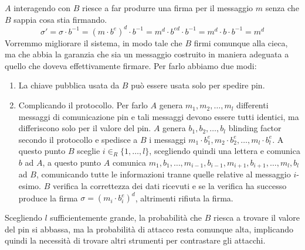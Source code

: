 $A$ interagendo con $B$ riesce a far produrre una firma per il messaggio $m$ senza che $B$ sappia
cosa stia firmando.
\[
  \sigma' = \sigma \cdot b^{-1} = (m \cdot  b^e)^d \cdot b^{-1} = m^d \cdot b^{ed} \cdot b^{-1} = 
  m^d \cdot b \cdot b^{-1} = m^d
\]
Vorremmo migliorare il sistema, in modo tale che $B$ firmi comunque alla cieca, ma che abbia la garanzia 
che sia un messaggio costruito in maniera adeguata a quello che doveva effettivamente firmare. Per farlo 
abbiamo due modi:
\begin{enumerate}
  \item La chiave pubblica usata da $B$ può essere usata solo per spedire pin.
  \item Complicando il protocollo. Per farlo $A$ genera $m_1, m_2, \dots, m_l$
  differenti messaggi di comunicazione pin e tali messaggi devono essere tutti 
  identici, ma differiscono solo per il valore del pin. $A$ genera $b_1, b_2, \dots, b_l$
  blinding factor secondo il protocollo e spedisce a $B$ i messaggi $m_1 \cdot b_1^e,
  m_2 \cdot b_2^e, \dots, m_l \cdot b_l^e$. A questo punto $B$ sceglie $i \in_R \{1, \dots, l\}$,
  scegliendo quindi una lettera e comunica $b$ ad $A$, a questo punto $A$ comunica 
  $m_1, b_1, \dots, m_{i-1},b_{i-1},m_{i+1},b_{i+1}, \dots, m_l, b_l$ ad $B$,
  comunicando tutte le informazioni tranne quelle relative al messaggio $i$-esimo.
  $B$ verifica la correttezza dei dati ricevuti e se la verifica ha successo produce 
  la firma $\sigma = (m_i \cdot b_i^e)^d$, altrimenti rifiuta la firma.
\end{enumerate}
Scegliendo $l$ sufficientemente grande, la probabilità che $B$ riesca a trovare il valore
del pin si abbassa, ma la probabilità di attacco resta comunque alta, implicando quindi 
la necessità di trovare altri strumenti per contrastare gli attacchi.
